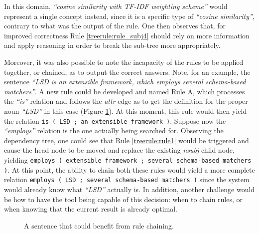 \documentclass[11pt,a4paper,openright]{memoir}
\begin{document}
In this domain, \emph{\enquote{cosine similarity with TF-IDF weighting scheme}} would represent a single concept instead, since it is a specific type of \emph{\enquote{cosine similarity}}, contrary to what was the output of the rule. One then observes that, for improved correctness Rule \ref{treerule:rule_subj4} should rely on more information and apply reasoning in order to break the sub-tree more appropriately.

Moreover, it was also possible to note the incapacity of the rules to be applied together, or chained, as to output the correct answers. Note, for an example, the sentence \emph{\enquote{LSD is an extensible framework, which employs several schema-based matchers}}. A new rule could be developed and named Rule A, which processes the \emph{\enquote{is}} relation and follows the \emph{attr} edge as to get the definition for the proper noun \emph{\enquote{LSD}} in this case (Figure \ref{fig:chaining_example}). At this moment, this rule would then yield the relation \texttt{is ( LSD ; an extensible framework )}. Suppose now the \emph{\enquote{employs}} relation is the one actually being searched for. Observing the dependency tree, one could see that Rule \ref{treerule:rule1} would be triggered and cause the head node to be moved and replace the existing \emph{nsubj} child node, yielding \texttt{employs	( extensible framework ; several schema-based matchers )}. At this point, the ability to chain both these rules would yield a more complete relation \texttt{employs	( LSD ; several schema-based matchers )} since the system would already know what \emph{\enquote{LSD}} actually is. In addition, another challenge would be how to have the tool being capable of this decision: when to chain rules, or when knowing that the current result is already optimal.


\begin{figure}[!htbp]

\centering
{}

\caption[A sentence that could benefit from rule chaining.]{A sentence that could benefit from rule chaining.}
\label{fig:chaining_example}
\end{figure}
\end{document}
